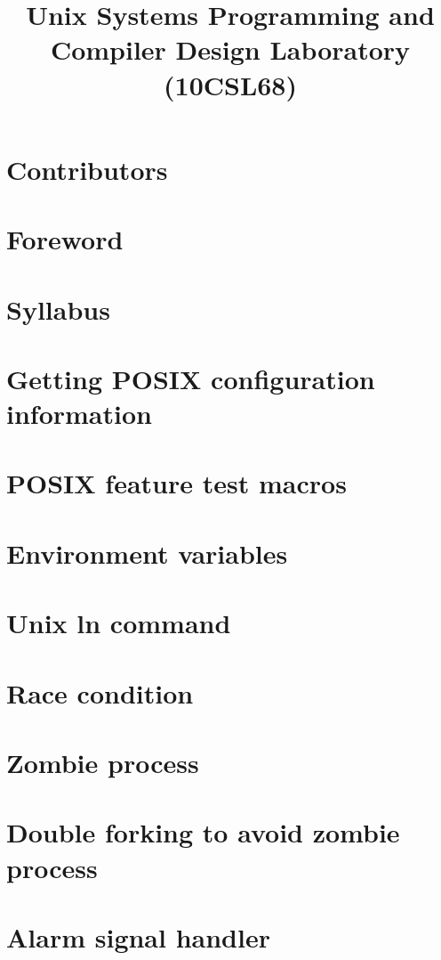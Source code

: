 \documentclass{report}
\begin{document}
\title{Unix Systems Programming and \\ Compiler Design Laboratory \\ (10CSL68)}
\maketitle

\chapter*{Contributors}


\chapter*{Foreword}


\chapter*{Syllabus}


\tableofcontents

\chapter{Getting POSIX configuration information}


\chapter{POSIX feature test macros}


\chapter{Environment variables}


\chapter{Unix ln command}


\chapter{Race condition}


\chapter{Zombie process}


\chapter{Double forking to avoid zombie process}


\chapter{Alarm signal handler}

\end{document}
